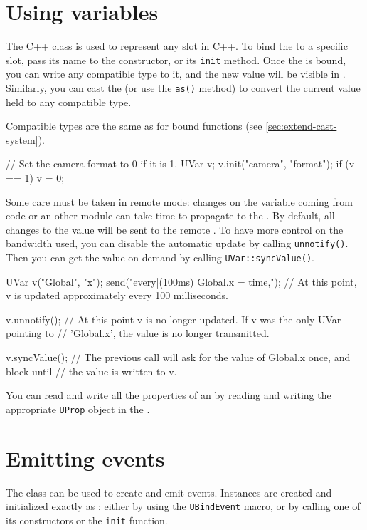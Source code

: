 \section{Using \urbi variables}

The C++ class \UVar is used to represent any \urbi slot in C++.  To bind the
\UVar to a specific slot, pass its name to the \UVar constructor, or its
\lstinline|init| method.  Once the \UVar is bound, you can write any
compatible type to it, and the new value will be visible in \us.  Similarly,
you can cast the \UVar (or use the \lstinline{as()} method) to convert the
current \us value held to any compatible type.

Compatible types are the same as for bound functions (see
\autoref{sec:extend-cast-system}).

\begin{cxx}
// Set the camera format to 0 if it is 1.
UVar v;
v.init("camera", "format");
if (v == 1)
 v = 0;
\end{cxx}

Some care must be taken in remote mode: changes on the variable coming from
\urbi code or an other module can take time to propagate to the \UVar. By
default, all changes to the value will be sent to the remote \UObject. To
have more control on the bandwidth used, you can disable the automatic
update by calling \lstinline|unnotify()|. Then you can get the value on
demand by calling \lstinline|UVar::syncValue()|.

\begin{cxx}
UVar v("Global", "x");
send("every|(100ms) Global.x = time,");
// At this point, v is updated approximately every 100 milliseconds.

v.unnotify();
// At this point v is no longer updated. If v was the only UVar pointing to
// 'Global.x', the value is no longer transmitted.

v.syncValue();
// The previous call will ask for the value of Global.x once, and block until
// the value is written to v.
\end{cxx}

You can read and write all the \urbi properties of an \UVar by
reading and writing the appropriate \lstinline{UProp} object in the
\UVar.

\section{Emitting events}

The \UEvent class can be used to create and emit \us events. Instances are
created and initialized exactly as \UVar: either by using the
\lstinline{UBindEvent} macro, or by calling one of its constructors or the
\lstinline{init} function.

